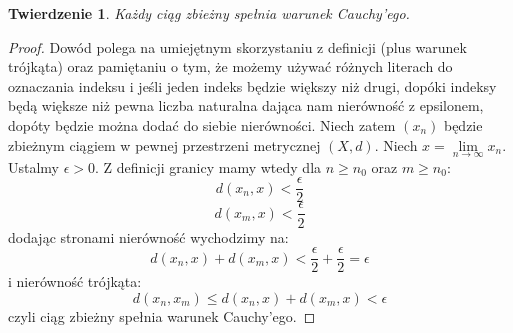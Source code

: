 \documentclass{article}
\newtheorem*{theorem}{Twierdzenie}
\begin{document}
\begin{theorem}
    Każdy ciąg zbieżny spełnia warunek Cauchy'ego.
\end{theorem}
\begin{proof}
    Dowód polega na umiejętnym skorzystaniu z definicji (plus warunek trójkąta) oraz pamiętaniu o tym, że możemy używać
    różnych literach do oznaczania indeksu i jeśli jeden indeks będzie większy niż drugi, dopóki indeksy będą
    większe niż pewna liczba naturalna dająca nam nierówność z epsilonem, dopóty będzie można dodać do siebie nierówności.
    Niech zatem \((x_n)\) będzie zbieżnym ciągiem w pewnej przestrzeni metrycznej \((X, d)\). Niech \(x = \lim\limits_{n \to \infty} x_n\).
    Ustalmy \(\epsilon > 0\). Z definicji granicy mamy wtedy dla \(n \geq n_0\) oraz \(m \geq n_0\):
    \begin{equation*}
        d(x_n, x) < \frac{\epsilon}{2}
    \end{equation*}
    \begin{equation*}
        d(x_m, x) < \frac{\epsilon}{2}
    \end{equation*}
    dodając stronami nierówność wychodzimy na:
    \begin{equation*}
        d(x_n, x) + d(x_m, x) < \frac{\epsilon}{2} + \frac{\epsilon}{2} = \epsilon
    \end{equation*}
    i nierówność trójkąta:
    \begin{equation*}
        d(x_n, x_m) \leq d(x_n, x) + d(x_m, x) <  \epsilon
    \end{equation*}
    czyli ciąg zbieżny spełnia warunek Cauchy'ego.
\end{proof}
\end{document}
